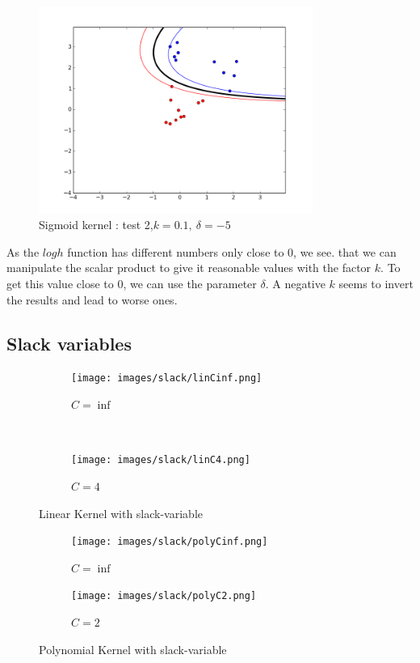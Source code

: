 \documentclass{article}
\begin{document}
\begin{figure}[!h]
    \centering
     \includegraphics[width=0.8\textwidth]{images/sigmoid/sigmo2.png}

    \caption{Sigmoid kernel : test 2,$k  = 0.1,~\delta = -5$ }
    \label{rbf_2}
\end{figure}


As the $logh$ function has different numbers only close to 0, we see. that we can manipulate the scalar product to give it reasonable values with the factor $k$. To get this value close to 0, we can use the parameter $\delta$. A negative $k$ seems to invert the results and lead to worse ones.

\newpage

\subsection{Slack variables}
\begin{figure}[!h]
    \centering
    \begin{subfigure}[b]{0.35\textwidth}
        \texttt{[image: images/slack/linCinf.png]}
        \caption{$C = \inf$} \label{slack_lin_figure_1}
    \end{subfigure}
    ~ 
    \begin{subfigure}[b]{0.35\textwidth}
        \texttt{[image: images/slack/linC4.png]}
        \caption{$C = 4$}  \label{slack_lin_figure_2}
    \end{subfigure}
	\caption{Linear Kernel with slack-variable}
    \label{lin_slack}
\end{figure}

\begin{figure}[!h]
    \centering
 \begin{subfigure}[b]{0.35\textwidth}
        \texttt{[image: images/slack/polyCinf.png]}
        \caption{$C = \inf$}  \label{slack_poly_figure_1}
    \end{subfigure}
    \begin{subfigure}[b]{0.35\textwidth}
        \texttt{[image: images/slack/polyC2.png]}
        \caption{$C = 2$}  \label{slack_poly_figure_2}
    \end{subfigure}
	\caption{Polynomial Kernel with slack-variable}
    \label{lin_slack}
\end{figure}
\end{document}
